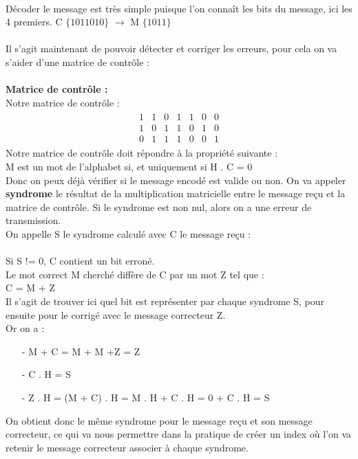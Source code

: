 \\
Décoder le message est très simple puisque l’on connaît les bits du message, ici les 4 premiers. C $\{1011010\}$ $\rightarrow$ M $\{1011\}$\\
\\
Il s’agit maintenant de pouvoir détecter et corriger les erreurs, pour cela on va s’aider d’une matrice de contrôle :
\\
\\ \textbf{Matrice de contrôle :}
\\
Notre matrice de contrôle :\\
\begin{align}
  \begin{matrix}
    1 & 1 & 0 & 1 & 1 & 0 & 0 \\
    1 & 0 & 1 & 1 & 0 & 1 & 0 \\
    0 & 1 & 1 & 1 & 0 & 0 & 1
  \end{matrix}
\end{align}
Notre matrice de contrôle doit répondre à la propriété suivante :\\
\tab M est un mot de l’alphabet si, et uniquement si H . C = 0
\\Donc on peux déjà vérifier si le message encodé est valide ou non. On va appeler \textbf{syndrome} le résultat de la multiplication matricielle entre le message reçu et la matrice de contrôle. Si le syndrome est non nul, alors on a une erreur de transmission.
\\
On appelle S le syndrome calculé avec C le message reçu :\\
\\
Si S != 0, C contient un bit erroné. \\
Le mot correct M cherché diffère de C par un mot Z tel que :\\
\tab C = M + Z\\
Il s’agit de trouver ici quel bit est représenter par chaque syndrome S, pour ensuite pour le corrigé avec le message correcteur Z.\\
Or on a :\\
\begin{enumerate}
  \item[-] M  + C = M + M +Z = Z
  \item[-] C . H = S
  \item[-] Z . H = (M + C) . H = M . H + C . H = 0 + C . H = S
\end{enumerate}
\newpage
On obtient donc le même syndrome pour le message reçu et son message correcteur, ce qui va nous permettre dans la pratique de créer un index où l’on va retenir le message correcteur associer à chaque syndrome.
